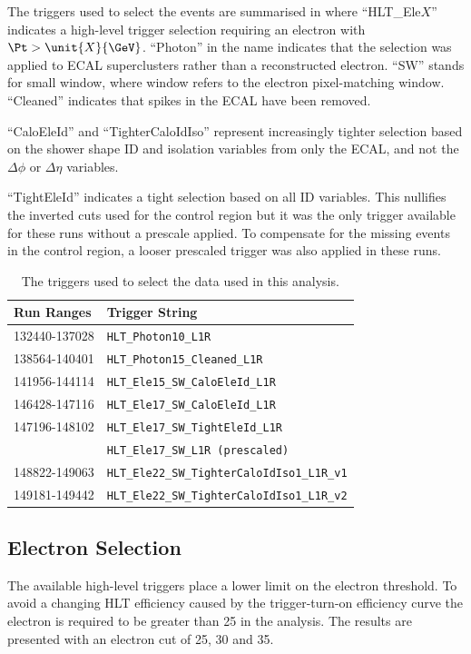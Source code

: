 The triggers used to select the events are summarised in 
where ``HLT\_Ele$X$'' indicates a high-level trigger selection requiring an
electron with  $\Pt > \unit{X}{\GeV}$.  ``Photon'' in the name indicates that
the selection was applied to ECAL superclusters rather than a reconstructed
electron.  ``SW'' stands for small window, where window refers to the electron
pixel-matching window.  ``Cleaned'' indicates that spikes in the {ECAL} have
been removed.  

``CaloEleId'' and ``TighterCaloIdIso'' represent increasingly tighter selection
based on the shower shape ID and isolation variables from only the {ECAL},
and not the $\Delta\phi$ or $\Delta\eta$ variables.  


``TightEleId'' indicates a tight selection based on all ID variables. 
This nullifies the inverted cuts used for the control region but
it was the only trigger available for these runs without a prescale applied.
To compensate for the missing events in the control region, a looser prescaled
trigger was also applied in these runs.

\begin{table}[htbp]
  \centering
  \begin{tabular}{ l l }
    \toprule
    Run Ranges & Trigger String\\
    \midrule
    132440-137028 & \verb=HLT_Photon10_L1R= \\
    138564-140401 & \verb=HLT_Photon15_Cleaned_L1R= \\
    141956-144114 & \verb=HLT_Ele15_SW_CaloEleId_L1R= \\
    146428-147116 & \verb=HLT_Ele17_SW_CaloEleId_L1R= \\
    147196-148102 & \verb=HLT_Ele17_SW_TightEleId_L1R= \\
                  & \verb=HLT_Ele17_SW_L1R (prescaled)= \\ 
    148822-149063 & \verb=HLT_Ele22_SW_TighterCaloIdIso1_L1R_v1= \\
    149181-149442 & \verb=HLT_Ele22_SW_TighterCaloIdIso1_L1R_v2= \\
    \bottomrule
  \end{tabular}
  \caption{The triggers used to select the data used in this analysis.}
  \label{tab:triggers}
\end{table}

\subsection{Electron Selection}
The available high-level triggers place a lower limit on the electron \pT
threshold.
To avoid a changing HLT efficiency caused by the trigger-turn-on efficiency
curve the electron \PT is required to be
greater than \unit{25}{\GeV} in the analysis. 
The results are presented with an electron \pT cut of 25, 30
and \unit{35}{\GeV}. 

